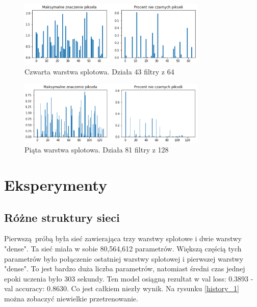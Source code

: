 \documentclass{article}
\begin{document}
\begin{figure}[H]
	\centering
	\includegraphics[width=0.8\textwidth,keepaspectratio=true]{statystyka_warstwy_4}
	\caption{Czwarta warstwa splotowa. Działa 43 filtry z 64}
	\label{statystyka_warstwy_4}
\end{figure}

\begin{figure}[H]
	\centering
	\includegraphics[width=0.8\textwidth,keepaspectratio=true]{statystyka_warstwy_5}
	\caption{Piąta warstwa splotowa. Działa 81 filtry z 128}
	\label{statystyka_warstwy_5}
\end{figure}

\section{Eksperymenty}

\subsection{Różne struktury sieci}
Pierwszą próbą była sieć zawierająca trzy warstwy splotowe i dwie warstwy "dense". Ta sieć miała w sobie 80,564,612 parametrów. Większą częścią tych parametrów było połączenie ostatniej warstwy splotowej i pierwszej warstwy "dense". To jest bardzo duża liczba parametrów, natomiast średni czas jednej epoki uczenia było 303 sekundy. Ten model osiągną rezultat w val loss: 0.3893 - val accuracy: 0.8630. Co jest całkiem niezły wynik. Na rysunku \ref{history_1} można zobaczyć niewielkie przetrenowanie. 
\end{document}
